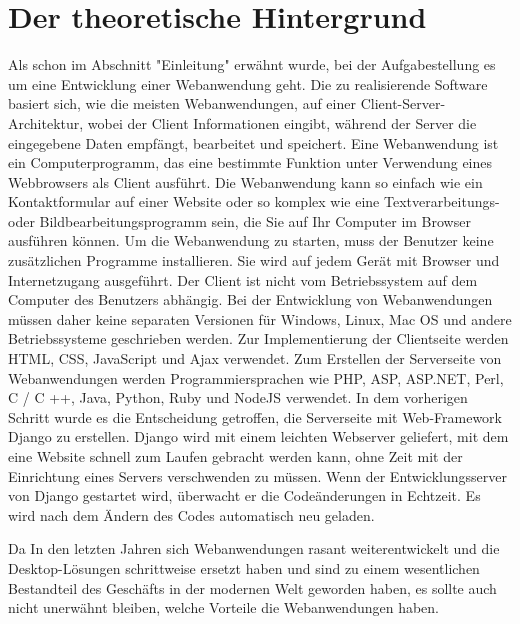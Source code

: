 \chapter{Der theoretische Hintergrund}
\label{sec:theorie}
Als schon im Abschnitt "Einleitung" erwähnt wurde, bei der Aufgabestellung es um eine Entwicklung einer Webanwendung geht. Die zu realisierende Software basiert sich, wie die meisten Webanwendungen, auf einer Client-Server-Architektur, wobei der Client Informationen eingibt, während der Server die eingegebene Daten empfängt, bearbeitet und speichert. Eine Webanwendung ist ein Computerprogramm, das eine bestimmte Funktion unter Verwendung eines Webbrowsers als Client ausführt. Die Webanwendung kann so einfach wie ein Kontaktformular auf einer Website oder so komplex wie eine Textverarbeitungs- oder Bildbearbeitungsprogramm sein, die Sie auf Ihr Computer im Browser ausführen können. Um die Webanwendung zu starten, muss der Benutzer keine zusätzlichen Programme installieren. Sie wird auf jedem Gerät mit Browser und Internetzugang ausgeführt. Der Client ist nicht vom Betriebssystem auf dem Computer des Benutzers abhängig. Bei der Entwicklung von Webanwendungen müssen daher keine separaten Versionen für Windows, Linux, Mac OS und andere Betriebssysteme geschrieben werden. Zur Implementierung der Clientseite werden HTML, CSS, JavaScript und Ajax verwendet. Zum Erstellen der Serverseite von Webanwendungen werden Programmiersprachen wie PHP, ASP, ASP.NET, Perl, C / C ++, Java, Python, Ruby und NodeJS verwendet. In dem vorherigen Schritt wurde es die Entscheidung getroffen, die Serverseite mit Web-Framework Django zu erstellen. Django wird mit einem leichten Webserver geliefert, mit dem eine  Website schnell zum Laufen gebracht werden kann, ohne Zeit mit der Einrichtung eines Servers verschwenden zu müssen. Wenn der Entwicklungsserver von Django gestartet wird, überwacht er die Codeänderungen in Echtzeit. Es wird nach dem Ändern des Codes automatisch neu geladen.

Da In den letzten Jahren sich Webanwendungen rasant weiterentwickelt und die Desktop-Lösungen schrittweise ersetzt haben und sind zu einem wesentlichen Bestandteil des Geschäfts in der modernen Welt geworden haben, es sollte auch nicht unerwähnt bleiben, welche Vorteile die Webanwendungen haben.

